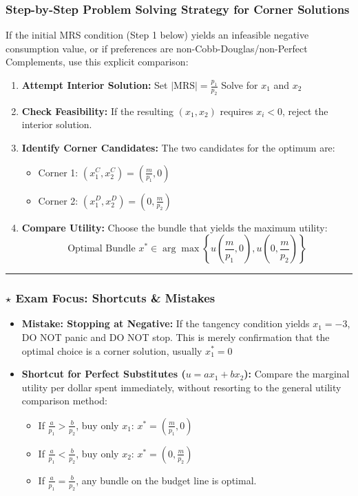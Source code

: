 \documentclass{article}
\begin{document}
\subsubsection*{Step-by-Step Problem Solving Strategy for Corner Solutions}

If the initial MRS condition (Step 1 below) yields an infeasible negative consumption value, or if preferences are non-Cobb-Douglas/non-Perfect Complements, use this explicit comparison:

\begin{enumerate}
    \item \textbf{Attempt Interior Solution:} Set $|\text{MRS}| = \frac{p_1}{p_2}$ Solve for $x_1$ and $x_2$
    \item \textbf{Check Feasibility:} If the resulting $(x_1, x_2)$ requires $x_i < 0$, reject the interior solution.
    \item \textbf{Identify Corner Candidates:} The two candidates for the optimum are:
    \begin{itemize}
        \item Corner 1: $(x_1^C, x_2^C) = (\frac{m}{p_1}, 0)$
        \item Corner 2: $(x_1^D, x_2^D) = (0, \frac{m}{p_2})$
    \end{itemize}
    \item \textbf{Compare Utility:} Choose the bundle that yields the maximum utility: \[\text{Optimal Bundle } x^* \in \arg\max \left\{ u\left(\frac{m}{p_1}, 0\right), u\left(0, \frac{m}{p_2}\right) \right\}\]
\end{enumerate}

\noindent\rule{\linewidth}{0.4pt}

\subsubsection*{$\star$ Exam Focus: Shortcuts \& Mistakes}

\begin{itemize}
    \item \textbf{Mistake: Stopping at Negative:} If the tangency condition yields $x_1=-3$, DO NOT panic and DO NOT stop. This is merely confirmation that the optimal choice is a corner solution, usually $x_1^*=0$
    \item \textbf{Shortcut for Perfect Substitutes ($u=ax_1 + bx_2$):} Compare the marginal utility per dollar spent immediately, without resorting to the general utility comparison method:
    \begin{itemize}
        \item If $\frac{a}{p_1} > \frac{b}{p_2}$, buy only $x_1$: $x^* = (\frac{m}{p_1}, 0)$
        \item If $\frac{a}{p_1} < \frac{b}{p_2}$, buy only $x_2$: $x^* = (0, \frac{m}{p_2})$
        \item If $\frac{a}{p_1} = \frac{b}{p_2}$, any bundle on the budget line is optimal.
    \end{itemize}
\end{itemize}
\end{document}
